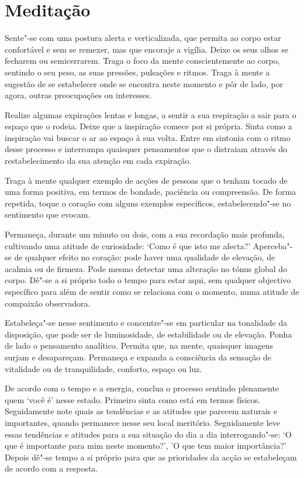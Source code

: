 
\chapter{Meditação}


Sente"-se com uma postura alerta e verticalizada, que permita ao corpo estar
confortável e sem se remexer, mas que encoraje a vigília. Deixe os seus olhos se
fecharem ou semicerrarem. Traga o foco da mente conscientemente ao corpo,
sentindo o seu peso, as suas pressões, pulsações e ritmos. Traga à mente a
sugestão de se estabelecer onde se encontra neste momento e pôr de lado, por
agora, outras preocupações ou interesses.

Realize algumas expirações lentas e longas, a sentir a sua respiração a sair
para o espaço que o rodeia. Deixe que a inspiração comece por si própria. Sinta
como a inspiração vai buscar o ar ao espaço à sua volta. Entre em sintonia com o
ritmo desse processo e interrompa quaisquer pensamentos que o distraiam através
do restabelecimento da sua atenção em cada expiração.

Traga à mente qualquer exemplo de acções de pessoas que o tenham tocado de uma
forma positiva, em termos de bondade, paciência ou compreensão. De forma
repetida, toque o coração com alguns exemplos específicos, estabelecendo"-se no
sentimento que evocam.

Permaneça, durante um minuto ou dois, com a sua recordação mais profunda,
cultivando uma atitude de curiosidade: `Como é que isto me afecta?' Aperceba"-se
de qualquer efeito no coração: pode haver uma qualidade de elevação, de acalmia
ou de firmeza. Pode mesmo detectar uma alteração no tónus global do corpo. Dê"-se
a si próprio todo o tempo para estar aqui, sem qualquer objectivo específico
para além de sentir como se relaciona com o momento, numa atitude de compaixão
observadora.

Estabeleça"-se nesse sentimento e concentre"-se em particular na tonalidade da
disposição, que pode ser de luminosidade, de estabilidade ou de elevação. Ponha
de lado o pensamento analítico. Permita que, na mente, quaisquer imagens surjam
e desapareçam. Permaneça e expanda a consciência da sensação de vitalidade ou de
tranquilidade, conforto, espaço ou luz.

De acordo com o tempo e a energia, conclua o processo sentindo plenamente quem
`você é' nesse estado. Primeiro sinta como está em termos físicos. Seguidamente
note quais as tendências e as atitudes que parecem naturais e importantes,
quando permanece nesse seu local meritório. Seguidamente leve essas tendências e
atitudes para a sua situação do dia a dia interrogando"-se: `O que é importante
para mim neste momento?', 'O que tem maior importância?' Depois dê"-se tempo a si
próprio para que as prioridades da acção se estabeleçam de acordo com a
resposta.
